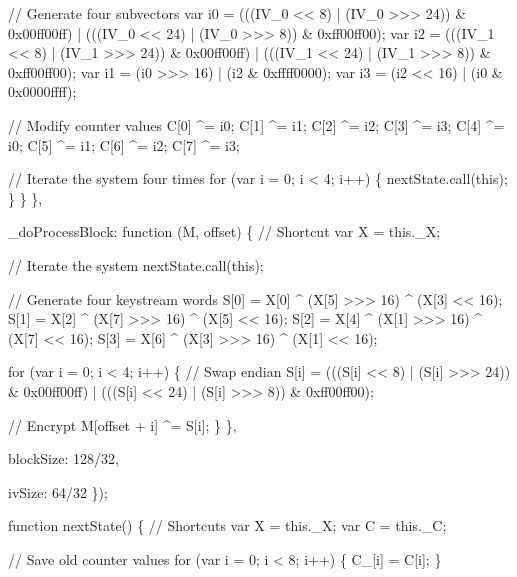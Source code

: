 \begin{DoxyCodeInclude}
                \textcolor{comment}{// Generate four subvectors}
                var i0 = (((IV\_0 << 8) | (IV\_0 >>> 24)) & 0x00ff00ff) | (((IV\_0 << 24) | (IV\_0 >>> 8)) & 
      0xff00ff00);
                var i2 = (((IV\_1 << 8) | (IV\_1 >>> 24)) & 0x00ff00ff) | (((IV\_1 << 24) | (IV\_1 >>> 8)) & 
      0xff00ff00);
                var i1 = (i0 >>> 16) | (i2 & 0xffff0000);
                var i3 = (i2 << 16)  | (i0 & 0x0000ffff);

                \textcolor{comment}{// Modify counter values}
                C[0] ^= i0;
                C[1] ^= i1;
                C[2] ^= i2;
                C[3] ^= i3;
                C[4] ^= i0;
                C[5] ^= i1;
                C[6] ^= i2;
                C[7] ^= i3;

                \textcolor{comment}{// Iterate the system four times}
                \textcolor{keywordflow}{for} (var i = 0; i < 4; i++) \{
                    nextState.call(\textcolor{keyword}{this});
                \}
            \}
        \},

        \_doProcessBlock: \textcolor{keyword}{function} (M, offset) \{
            \textcolor{comment}{// Shortcut}
            var X = this.\_X;

            \textcolor{comment}{// Iterate the system}
            nextState.call(\textcolor{keyword}{this});

            \textcolor{comment}{// Generate four keystream words}
            S[0] = X[0] ^ (X[5] >>> 16) ^ (X[3] << 16);
            S[1] = X[2] ^ (X[7] >>> 16) ^ (X[5] << 16);
            S[2] = X[4] ^ (X[1] >>> 16) ^ (X[7] << 16);
            S[3] = X[6] ^ (X[3] >>> 16) ^ (X[1] << 16);

            \textcolor{keywordflow}{for} (var i = 0; i < 4; i++) \{
                \textcolor{comment}{// Swap endian}
                S[i] = (((S[i] << 8)  | (S[i] >>> 24)) & 0x00ff00ff) |
                       (((S[i] << 24) | (S[i] >>> 8))  & 0xff00ff00);

                \textcolor{comment}{// Encrypt}
                M[offset + i] ^= S[i];
            \}
        \},

        blockSize: 128/32,

        ivSize: 64/32
    \});

    \textcolor{keyword}{function} nextState() \{
        \textcolor{comment}{// Shortcuts}
        var X = this.\_X;
        var C = this.\_C;

        \textcolor{comment}{// Save old counter values}
        \textcolor{keywordflow}{for} (var i = 0; i < 8; i++) \{
            C\_[i] = C[i];
        \}


\end{DoxyCodeInclude}
